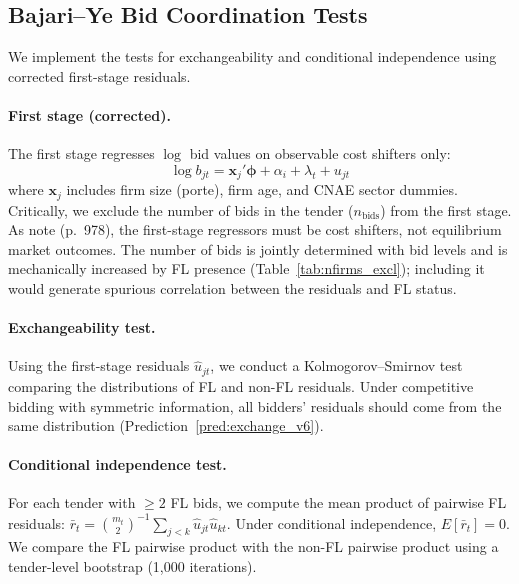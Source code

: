
\subsection{Bajari--Ye Bid Coordination Tests}
\label{sec:bajari_ye}

We implement the \citet{bajari2003deciding} tests for exchangeability
and conditional independence using corrected first-stage residuals.

\paragraph{First stage (corrected).} %
The first stage regresses $\log$ bid values on observable cost shifters
only:
\begin{equation}
  \log b_{jt} = \mathbf{x}_j'\boldsymbol{\phi} + \alpha_i + \lambda_t
  + u_{jt}
  \label{eq:by_first_stage}
\end{equation}
where $\mathbf{x}_j$ includes firm size (porte), firm age, and CNAE
sector dummies. Critically, we exclude the number of bids in the
tender ($n_{\text{bids}}$) from the first stage. As
\citet{bajari2003deciding} note (p.~978), the first-stage regressors
must be cost shifters, not equilibrium market outcomes. The number of
bids is jointly determined with bid levels and is mechanically increased
by FL presence (Table~\ref{tab:nfirms_excl}); including it would
generate spurious correlation between the residuals and FL status.

\paragraph{Exchangeability test.}
Using the first-stage residuals $\hat{u}_{jt}$, we conduct a
Kolmogorov--Smirnov test comparing the distributions of FL and non-FL
residuals. Under competitive bidding with symmetric information, all
bidders' residuals should come from the same distribution
(Prediction~\ref{pred:exchange_v6}).

\paragraph{Conditional independence test.}
For each tender with $\geq 2$ FL bids, we compute the mean product of
pairwise FL residuals:
$\bar{r}_t = \binom{m_t}{2}^{-1} \sum_{j < k}
\hat{u}_{jt} \hat{u}_{kt}$.
Under conditional independence, $E[\bar{r}_t] = 0$. We compare the FL
pairwise product with the non-FL pairwise product using a tender-level
bootstrap (1,000 iterations).


